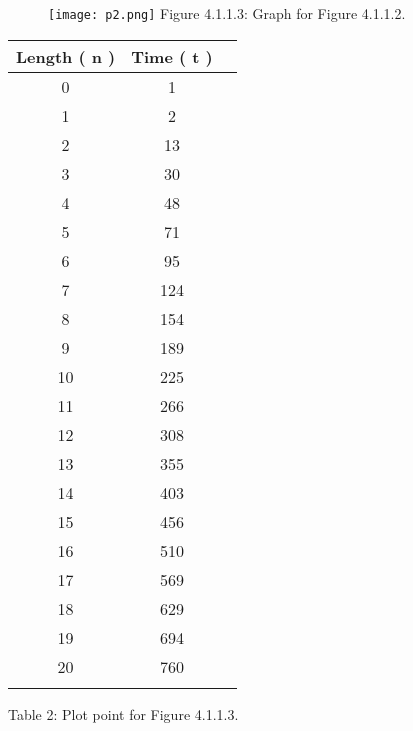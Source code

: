 \begin{multicols}{2}
\begin{figure}[H]
\texttt{[image: p2.png]}
\centering \linebreak \linebreak Figure 4.1.1.3: Graph for Figure 4.1.1.2.
\end{figure}

\begin{center}
\begin{itemize}

\end{itemize}
\begin{tabular}[.5cm]{ c c c }
\toprule
Length ( n ) & Time ( t ) \\
\midrule
0 & 1 \\
\cmidrule {1-2}
1 & 2 \\
\cmidrule {1-2}
2 & 13 \\
\cmidrule {1-2}
3 & 30 \\
\cmidrule {1-2}
4 & 48 \\
\cmidrule {1-2}
5 & 71 \\
\cmidrule {1-2}
6 & 95 \\
\cmidrule {1-2}
7 & 124 \\
\cmidrule {1-2}
8 & 154 \\
\cmidrule {1-2}
9 & 189 \\
\cmidrule {1-2}
10 & 225 \\
\cmidrule {1-2}
11 & 266 \\
\cmidrule {1-2}
12 & 308 \\
\cmidrule {1-2}
13 & 355 \\
\cmidrule {1-2}
14 & 403 \\
\cmidrule {1-2}
15 & 456 \\
\cmidrule {1-2}
16 & 510 \\
\cmidrule {1-2}
17 & 569 \\
\cmidrule {1-2}
18 & 629 \\
\cmidrule {1-2}
19 & 694 \\
\cmidrule {1-2}
20 & 760 \\
\bottomrule
\linebreak
\end{tabular}
\linebreak \linebreak Table 2: Plot point for Figure 4.1.1.3.
\end{center}
\end{multicols} \hfill

{\bfseries\itshape\color{armygreen}{Observation:}} {\itshape{}} \hfill \break

